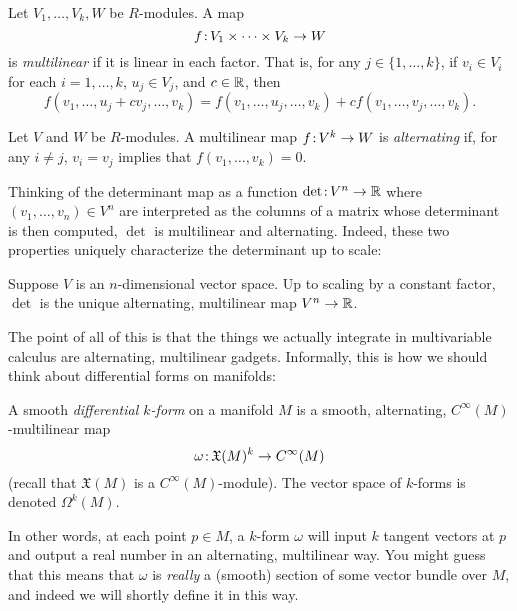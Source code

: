 \begin{definition}\label{def:multilinear}
	Let $V_1, \dots , V_k, W$ be $R$-modules. A map
	\[
		f \colon\thinspace\!\! V_1 \times \dots \times V_k \to W
	\]
	is \emph{multilinear} if it is linear in each factor. That is, for any $j \in \{1, \dots , k\}$, if $v_i \in V_i$ for each $i=1, \dots , k$, $u_j \in V_j$, and $c \in \mathbb{R}$, then
	\[
		f(v_1, \dots , u_j + c v_j , \dots , v_k) = f(v_1, \dots , u_j, \dots , v_k) + c f(v_1, \dots , v_j, \dots , v_k).
	\]
\end{definition}

\begin{definition}\label{def:alternating}
	Let $V$ and $W$ be $R$-modules. A multilinear map $f\colon\thinspace\!\! V^k \to W$ is \emph{alternating} if, for any $i \neq j$, $v_i = v_j$ implies that $f(v_1, \dots , v_k) = 0$.
\end{definition}

Thinking of the determinant map as a function $\det\colon\thinspace\!\! V^n \to \mathbb{R}$ where $(v_1, \dots , v_n) \in V^n$ are interpreted as the columns of a matrix whose determinant is then computed, $\det$ is multilinear and alternating. Indeed, these two properties uniquely characterize the determinant up to scale:

\begin{theorem}\label{thm:determinant}
	Suppose $V$ is an $n$-dimensional vector space. Up to scaling by a constant factor, $\det$ is the unique alternating, multilinear map $V^n \to \mathbb{R}$. 
\end{theorem}

The point of all of this is that the things we actually integrate in multivariable calculus are alternating, multilinear gadgets. Informally, this is how we should think about differential forms on manifolds:

\begin{definition}\label{def:informal differential form}
	A smooth \emph{differential $k$-form} on a manifold $M$ is a smooth, alternating, $C^\infty(M)$-multilinear map
	\[
		\omega \colon\thinspace\!\! \mathfrak{X}(M)^k \to C^\infty(M)
	\]
	(recall that $\mathfrak{X}(M)$ is a $C^\infty(M)$-module). The vector space of $k$-forms is denoted $\Omega^k(M)$.
\end{definition}

In other words, at each point $p \in M$, a $k$-form $\omega$ will input $k$ tangent vectors at $p$ and output a real number in an alternating, multilinear way. You might guess that this means that $\omega$ is \emph{really} a (smooth) section of some vector bundle over $M$, and indeed we will shortly define it in this way. 


